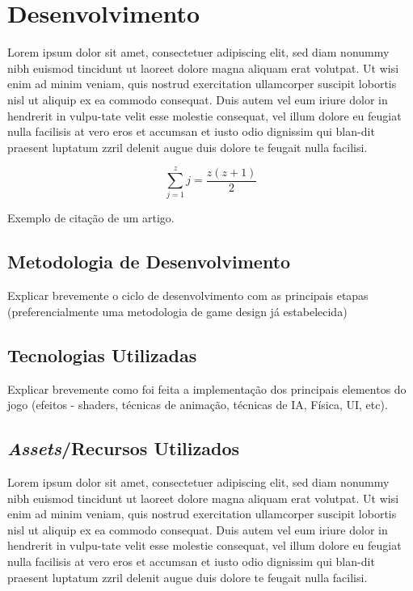 \section{Desenvolvimento}
\label{secao:desenvolvimento}
Lorem ipsum dolor sit amet, consectetuer adipiscing elit, sed diam nonummy nibh euismod tincidunt ut laoreet dolore magna aliquam erat volutpat. Ut wisi enim ad minim veniam, quis nostrud exercitation ullamcorper suscipit lobortis nisl ut aliquip ex ea commodo consequat. Duis autem vel eum iriure dolor in hendrerit in vulpu-tate velit esse molestie consequat, vel illum dolore eu feugiat nulla facilisis at vero eros et accumsan et iusto odio dignissim qui blan-dit praesent luptatum zzril delenit augue duis dolore te feugait nulla facilisi.


\begin{equation}
 \sum_{j=1}^{z} j = \frac{z(z+1)}{2}
\end{equation}

Exemplo de citação de um artigo\cite{Nielson:1991:TAD}.

\subsection{Metodologia de Desenvolvimento}
\label{secao:metodologia_de_desenvolvimento}
Explicar brevemente o ciclo de desenvolvimento com as principais etapas (preferencialmente uma metodologia de game design já estabelecida)

\subsection{Tecnologias Utilizadas}
\label{secao:tecnologias_utilizadas}
Explicar brevemente como foi feita a implementação dos principais elementos do jogo (efeitos - shaders, técnicas de animação, técnicas de IA, Física, UI, etc).


\subsection{\textit{Assets}/Recursos Utilizados}
\label{secao:assets_recursos_utilizados}
Lorem ipsum dolor sit amet, consectetuer adipiscing elit, sed diam nonummy nibh euismod tincidunt ut laoreet dolore magna aliquam erat volutpat. Ut wisi enim ad minim veniam, quis nostrud exercitation ullamcorper suscipit lobortis nisl ut aliquip ex ea commodo consequat. Duis autem vel eum iriure dolor in hendrerit in vulpu-tate velit esse molestie consequat, vel illum dolore eu feugiat nulla facilisis at vero eros et accumsan et iusto odio dignissim qui blan-dit praesent luptatum zzril delenit augue duis dolore te feugait nulla facilisi.

